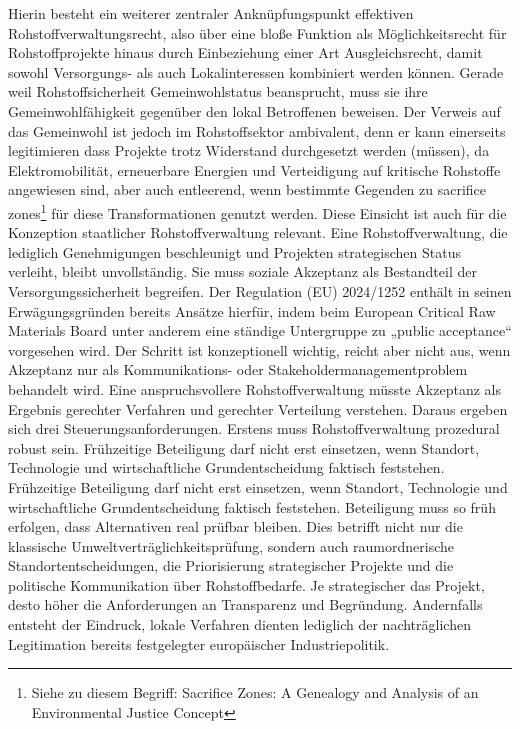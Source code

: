 \documentclass[12pt,a4paper,oneside]{book} %
\begin{document}
{Hierin besteht ein weiterer zentraler Anknüpfungspunkt effektiven Rohstoffverwaltungsrecht, also über eine bloße Funktion als Möglichkeitsrecht für Rohstoffprojekte hinaus durch Einbeziehung einer Art Ausgleichsrecht, damit sowohl Versorgungs- als auch Lokalinteressen kombiniert werden können. Gerade weil Rohstoffsicherheit Gemeinwohlstatus beansprucht, muss sie ihre Gemeinwohlfähigkeit gegenüber den lokal Betroffenen beweisen. Der Verweis auf das Gemeinwohl ist jedoch im Rohstoffsektor ambivalent, denn er kann einerseits legitimieren dass Projekte trotz Widerstand durchgesetzt werden (müssen), da Elektromobilität, erneuerbare Energien und Verteidigung auf kritische Rohstoffe angewiesen sind, aber auch entleerend, wenn bestimmte Gegenden zu \glqq sacrifice zones\grqq\footnote{Siehe zu diesem Begriff: Sacrifice Zones: A Genealogy and Analysis of an Environmental Justice Concept} für diese Transformationen genutzt werden. Diese Einsicht ist auch für die Konzeption staatlicher Rohstoffverwaltung relevant. Eine Rohstoffverwaltung, die lediglich Genehmigungen beschleunigt und Projekten strategischen Status verleiht, bleibt unvollständig. Sie muss soziale Akzeptanz als Bestandteil der Versorgungssicherheit begreifen. Der Regulation (EU) 2024/1252 enthält in seinen Erwägungsgründen bereits Ansätze hierfür, indem beim European Critical Raw Materials Board unter anderem eine ständige Untergruppe zu „public acceptance“ vorgesehen wird. Der Schritt ist konzeptionell wichtig, reicht aber nicht aus, wenn Akzeptanz nur als Kommunikations- oder Stakeholdermanagementproblem behandelt wird. Eine anspruchsvollere Rohstoffverwaltung müsste Akzeptanz als Ergebnis gerechter Verfahren und gerechter Verteilung verstehen. Daraus ergeben sich drei Steuerungsanforderungen.
Erstens muss Rohstoffverwaltung prozedural robust sein. Frühzeitige Beteiligung darf nicht erst einsetzen, wenn Standort, Technologie und wirtschaftliche Grundentscheidung faktisch feststehen. Frühzeitige Beteiligung darf nicht erst einsetzen, wenn Standort, Technologie und wirtschaftliche Grundentscheidung faktisch feststehen. Beteiligung muss so früh erfolgen, dass Alternativen real prüfbar bleiben. Dies betrifft nicht nur die klassische Umweltverträglichkeitsprüfung, sondern auch raumordnerische Standortentscheidungen, die Priorisierung strategischer Projekte und die politische Kommunikation über Rohstoffbedarfe. Je strategischer das Projekt, desto höher die Anforderungen an Transparenz und Begründung. Andernfalls entsteht der Eindruck, lokale Verfahren dienten lediglich der nachträglichen Legitimation bereits festgelegter europäischer Industriepolitik.
}
\end{document}
